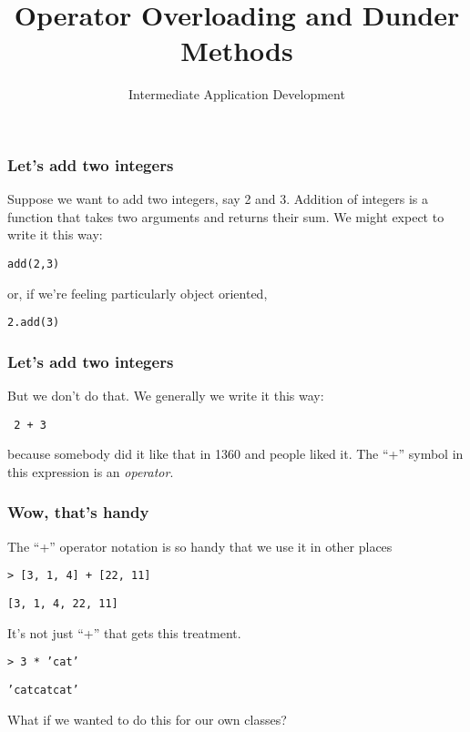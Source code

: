 \documentclass[10pt]{beamer}
\title{Operator Overloading and Dunder Methods}
\author[IN608]{Intermediate Application Development}
\institute[Otago Polytechnic]{
  Otago Polytechnic \\
  Dunedin, New Zealand \\
  Kaiako: Tom Clark
}
\date{}
\begin{document}
\begin{frame}[plain]
  \titlepage
\end{frame}

\begin{frame}
  \frametitle{Let's add two integers}
  
  Suppose we want to add two integers, say 2 and 3. Addition of integers
  is a function that takes two arguments and returns their sum. We might 
  expect to write it this way:
  
  \vspace{5mm}
  \texttt{add(2,3)}

  \vspace{5mm}
  or, if we're feeling particularly object oriented,

  \vspace{5mm}
  \texttt{2.add(3)}

        
\end{frame}

\begin{frame}
  \frametitle{Let's add two integers}
  
    But we don't do that. We generally we write it this way:

  \vspace{5mm}
  \texttt{ 2 + 3}

  \vspace{5mm}
  because somebody did it like that in 1360 and people liked it. The 
  ``+'' symbol in this expression is an \emph{operator}.
      
\end{frame}

\begin{frame}
  \frametitle{Wow, that's handy}
  
  The ``+'' operator notation is so handy that we use it in other places

  \vspace{5mm}
  \texttt{> [3, 1, 4] + [22, 11]}
  
  \texttt{[3, 1, 4, 22, 11]}

  \vspace{5mm}
  It's not just ``+'' that gets this treatment.
  
  \vspace{5mm}
  \texttt{> 3 * 'cat'}
  
  \texttt{'catcatcat'}

  \vspace{5mm}
   What if we wanted to do this for our own classes?    
\end{frame}
\end{document}
